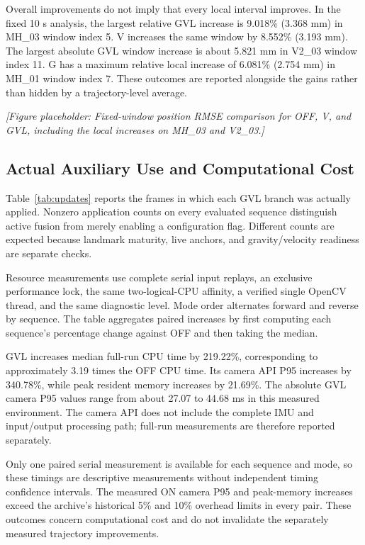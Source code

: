 \documentclass[a4paper,runningheads,twocolumn]{llncs}
\newcommand{\placeholder}[1]{\par\smallskip\noindent\textit{[Figure placeholder: #1]}\par\smallskip}
\begin{document}
Overall improvements do not imply that every local interval improves. In the fixed 10 s analysis, the largest relative GVL increase is 9.018\% (3.368 mm) in MH\_03 window index 5. V increases the same window by 8.552\% (3.193 mm). The largest absolute GVL window increase is about 5.821 mm in V2\_03 window index 11. G has a maximum relative local increase of 6.081\% (2.754 mm) in MH\_01 window index 7. These outcomes are reported alongside the gains rather than hidden by a trajectory-level average.
\placeholder{Fixed-window position RMSE comparison for OFF, V, and GVL, including the local increases on MH\_03 and V2\_03.}

\subsection{Actual Auxiliary Use and Computational Cost}
Table~\ref{tab:updates} reports the frames in which each GVL branch was actually applied. Nonzero application counts on every evaluated sequence distinguish active fusion from merely enabling a configuration flag. Different counts are expected because landmark maturity, live anchors, and gravity/velocity readiness are separate checks.


Resource measurements use complete serial input replays, an exclusive performance lock, the same two-logical-CPU affinity, a verified single OpenCV thread, and the same diagnostic level. Mode order alternates forward and reverse by sequence. The table aggregates paired increases by first computing each sequence's percentage change against OFF and then taking the median.


GVL increases median full-run CPU time by 219.22\%, corresponding to approximately 3.19 times the OFF CPU time. Its camera API P95 increases by 340.78\%, while peak resident memory increases by 21.69\%. The absolute GVL camera P95 values range from about 27.07 to 44.68 ms in this measured environment. The camera API does not include the complete IMU and input/output processing path; full-run measurements are therefore reported separately.

Only one paired serial measurement is available for each sequence and mode, so these timings are descriptive measurements without independent timing confidence intervals. The measured ON camera P95 and peak-memory increases exceed the archive's historical 5\% and 10\% overhead limits in every pair. These outcomes concern computational cost and do not invalidate the separately measured trajectory improvements.
\end{document}

